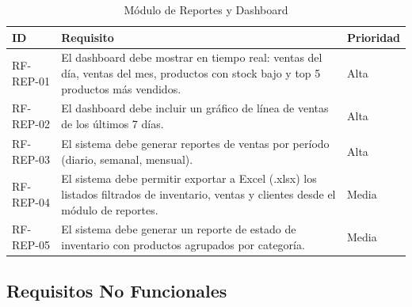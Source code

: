 \begin{longtable}[]{@{}
  >{\raggedright\arraybackslash}p{}
  >{\raggedright\arraybackslash}p{}
  >{\raggedright\arraybackslash}p{}@{}}
\caption[Módulo de Reportes y Dashboard]{Módulo de Reportes y Dashboard}\tabularnewline
\toprule\noalign{}
\begin{minipage}[b]{\linewidth}\raggedright
ID
\end{minipage} & \begin{minipage}[b]{\linewidth}\raggedright
Requisito
\end{minipage} & \begin{minipage}[b]{\linewidth}\raggedright
Prioridad
\end{minipage} \\
\midrule\noalign{}
\endhead
\bottomrule\noalign{}
\endlastfoot
RF-REP-01 & El dashboard debe mostrar en tiempo real: ventas del día, ventas del mes, productos con stock bajo y top 5 productos más vendidos. & Alta \\
RF-REP-02 & El dashboard debe incluir un gráfico de línea de ventas de los últimos 7 días. & Alta \\
RF-REP-03 & El sistema debe generar reportes de ventas por período (diario, semanal, mensual). & Alta \\
RF-REP-04 & El sistema debe permitir exportar a Excel (.xlsx) los listados filtrados de inventario, ventas y clientes desde el módulo de reportes. & Media \\
RF-REP-05 & El sistema debe generar un reporte de estado de inventario con productos agrupados por categoría. & Media \\
\end{longtable}

\subsection{Requisitos No Funcionales}\label{requisitos-no-funcionales}

